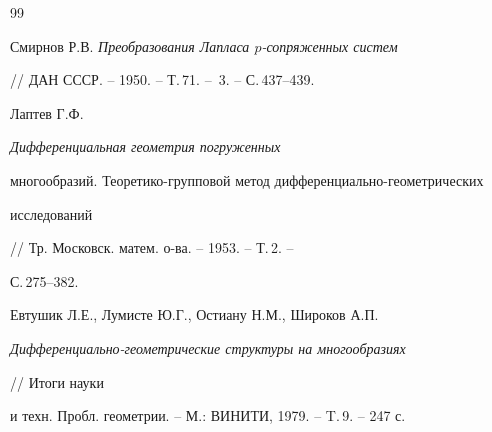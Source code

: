 \begin{thebibliography}{99}


Смирнов Р.В. {\em Преобразования Лапласа $p$-сопряженных систем} 


// ДАН СССР. -- 1950. -- Т.\,71. -- \No\,3. -- С.\,437--439. 




Лаптев Г.Ф. {\em Дифференциальная геометрия погруженных 


многообразий. Теоретико-групповой метод дифференциально-геометрических 


исследований} // Тр. Московск. матем. о-ва. -- 1953. -- Т.\,2. -- 


С.\,275--382. 




Евтушик Л.Е., Лумисте Ю.Г., Остиану Н.М., Широков А.П. 


{\em Дифференциально-геометрические структуры на многообразиях} 


// Итоги науки 


и техн. Пробл. геометрии. -- М.: ВИНИТИ, 1979. -- T.\,9. -- 247 с. 


 


\end{thebibliography} 


 


\vskip 2cm 


 






 


\label{end} 


 


